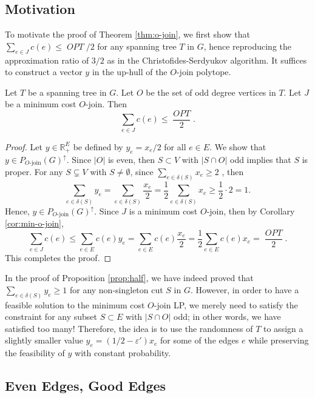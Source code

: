 \documentclass[letterpaper, reqno,12pt]{article}
\newcommand{\RR}{\mathbb{R}}
\DeclareMathOperator{\OPT}{\mathit{OPT}}
\begin{document}
\subsection{Motivation}

To motivate the proof of Theorem \ref{thm:o-join}, we first show that $\sum_{e \in J} c(e) \leq \OPT/2$ for any spanning tree $T$ in $G$, hence reproducing the approximation ratio of $3/2$ as in the Christofides-Serdyukov algorithm. It suffices to construct a vector $y$ in the up-hull of the $O$-join polytope.

\begin{proposition} \label{prop:half}
  Let $T$ be a spanning tree in $G$. Let $O$ be the set of odd degree vertices in $T$. Let $J$ be a minimum cost $O$-join. Then
  $$ \sum_{e \in J} c(e) \leq \frac{\OPT}{2}. $$
\end{proposition}

\begin{proof}
  Let $y \in \RR_+^E$ be defined by $y_e = x_e/2$ for all $e \in E$. We show that $y \in P_\text{$O$-join}(G)^\uparrow$. Since $|O|$ is even, then $S \subset V$ with $|S \cap O|$ odd implies that $S$ is proper. For any $S \subsetneq V$ with $S \neq \emptyset$, since $\sum_{e \in \delta(S)} x_e \geq 2$ , then
  $$ \sum_{e \in \delta(S)} y_e = \sum_{e \in \delta(S)} \frac{x_e}{2} = \frac{1}{2} \sum_{e \in \delta(S)} x_e \geq \frac{1}{2} \cdot 2 = 1. $$
  Hence, $y \in P_\text{$O$-join}(G)^\uparrow$. Since $J$ is a minimum cost $O$-join, then by Corollary \ref{cor:min-o-join},
  $$ \sum_{e \in J} c(e) \leq \sum_{e \in E} c(e) y_e = \sum_{e \in E} c(e) \frac{x_e}{2} = \frac{1}{2} \sum_{e \in E} c(e) x_e = \frac{\OPT}{2}. $$
  This completes the proof.
\end{proof}

In the proof of Proposition \ref{prop:half}, we have indeed proved that $\sum_{e \in \delta(S)} y_e \geq 1$ for any non-singleton cut $S$ in $G$. However, in order to have a feasible solution to the minimum cost $O$-join LP, we merely need to satisfy the constraint for any subset $S \subset E$ with $|S \cap O|$ odd; in other words, we have satisfied too many! Therefore, the idea is to use the randomness of $T$ to assign a slightly smaller value $y_e = (1/2 - \varepsilon') x_e$ for some of the edges $e$ while preserving the feasibility of $y$ with constant probability.

\subsection{Even Edges, Good Edges}
\end{document}
